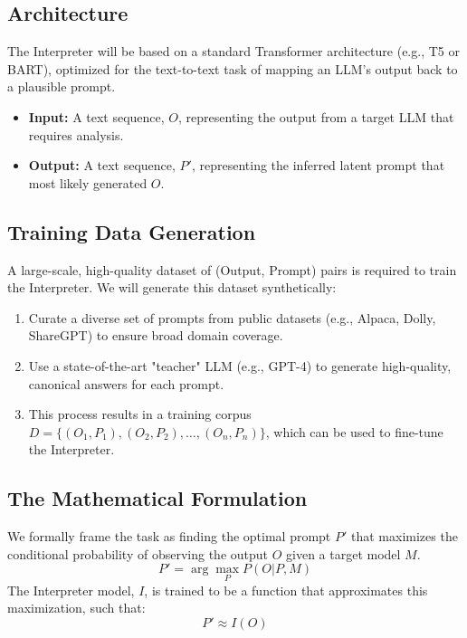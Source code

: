 \documentclass{article}
\begin{document}
\subsection{Architecture}
The Interpreter will be based on a standard Transformer architecture (e.g., T5 or BART), optimized for the text-to-text task of mapping an LLM's output back to a plausible prompt.
\begin{itemize}
    \item \textbf{Input:} A text sequence, $O$, representing the output from a target LLM that requires analysis.
    \item \textbf{Output:} A text sequence, $P'$, representing the inferred latent prompt that most likely generated $O$.
\end{itemize}

\subsection{Training Data Generation}
A large-scale, high-quality dataset of (Output, Prompt) pairs is required to train the Interpreter. We will generate this dataset synthetically:
\begin{enumerate}
    \item Curate a diverse set of prompts from public datasets (e.g., Alpaca, Dolly, ShareGPT) to ensure broad domain coverage.
    \item Use a state-of-the-art "teacher" LLM (e.g., GPT-4) to generate high-quality, canonical answers for each prompt.
    \item This process results in a training corpus $D = \{(O_1, P_1), (O_2, P_2), \dots, (O_n, P_n)\}$, which can be used to fine-tune the Interpreter.
\end{enumerate}

\subsection{The Mathematical Formulation}
We formally frame the task as finding the optimal prompt $P'$ that maximizes the conditional probability of observing the output $O$ given a target model $M$.
\begin{equation}
    P' = \arg\max_{P} P(O | P, M)
\end{equation}
The Interpreter model, $I$, is trained to be a function that approximates this maximization, such that:
\begin{equation}
    P' \approx I(O)
\end{equation}
\end{document}
